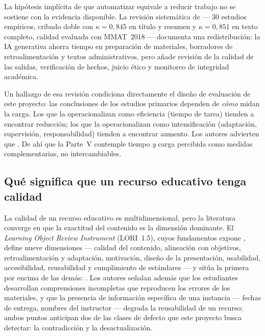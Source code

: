 La hipótesis implícita de que automatizar equivale a reducir trabajo no se sostiene
con la evidencia disponible. La revisión sistemática de \textcite{su2026efficiency}
--- 30 estudios empíricos, cribado doble con $\kappa = 0{,}845$ en título y resumen
y $\kappa = 0{,}851$ en texto completo, calidad evaluada con MMAT~2018 ---
documenta una redistribución: la IA generativa ahorra tiempo en preparación de
materiales, borradores de retroalimentación y textos administrativos, pero añade
revisión de la calidad de las salidas, verificación de hechos, juicio ético y
monitoreo de integridad académica.

Un hallazgo de esa revisión condiciona directamente el diseño de evaluación de este
proyecto: las conclusiones de los estudios primarios dependen de \emph{cómo} midan
la carga. Los que la operacionalizan como eficiencia (tiempo de tarea) tienden a
encontrar reducción; los que la operacionalizan como intensificación (adaptación,
supervisión, responsabilidad) tienden a encontrar aumento. Los autores advierten
que . De ahí que la Parte~V contemple tiempo \emph{y} carga
percibida como medidas complementarias, no intercambiables.

\subsection{Qué significa que un recurso educativo tenga calidad}
\label{sec:contexto-calidad}

La calidad de un recurso educativo es multidimensional, pero la literatura converge
en que la exactitud del contenido es la dimensión dominante. El
\emph{Learning Object Review Instrument} (LORI~1.5), cuyos fundamentos expone
\textcite{leacock2007framework}, define nueve dimensiones --- calidad del contenido,
alineación con objetivos, retroalimentación y adaptación, motivación, diseño de la
presentación, usabilidad, accesibilidad, reusabilidad y cumplimiento de estándares ---
y sitúa la primera por encima de las demás:
. Los autores señalan además que los estudiantes desarrollan
comprensiones incompletas que reproducen los errores de los materiales, y que la
presencia de información específica de una instancia --- fechas de entrega, nombres
del instructor --- degrada la reusabilidad de un recurso; ambos puntos anticipan dos
de las clases de defecto que este proyecto busca detectar: la contradicción y la
desactualización.

